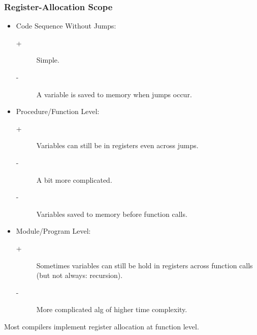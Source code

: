 \documentclass{beamer}
\renewcommand{\emph}[1]{\textcolor{structure}{#1}}
\newcommand{\emp}[1]{\textcolor{DikuRed}{ #1}}
\begin{document}
\begin{frame}[fragile,t]
   \frametitle{Register-Allocation Scope}

\bigskip

\begin{itemize}

    \item \emph{Code Sequence Without Jumps:}

        \begin{description}
            \item[+] \emph{Simple.}
            \item[-] \emp{A variable is saved to memory when jumps occur.}
        \end{description}\bigskip


    \item \emph{Procedure/Function Level:}

        \begin{description}
            \item[+] \emph{Variables can still be in registers even across jumps.}
            \item[-] \emp{A bit more complicated.}
            \item[-] \emp{Variables saved to memory before function calls.}
        \end{description}

    \item \emph{Module/Program Level:}

        \begin{description}
            \item[+] \emph{Sometimes variables can still be hold in registers
                        across function calls (but not always: recursion).}
            \item[-] \emp{More complicated alg of higher time complexity. }
        \end{description}

\end{itemize}

\bigskip

Most compilers implement register allocation at function level.

\end{frame}
\end{document}
